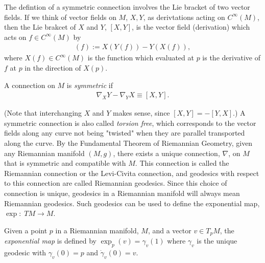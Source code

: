 The defintion of a symmetric connection involves the Lie bracket of two vector fields. If we think of vector fields on $M$, $X, Y$, as derivtations acting on $C^\infty (M)$, then the Lie brakcet of $X$ and $Y$, $[X , Y]$, is the vector field (derivation) which acts on $f \in C^\infty (M)$ by
\begin{align*}
[X , Y] (f) := X(Y(f)) - Y(X(f)),
\end{align*}
where $X(f) \in C^\infty (M)$ is the function which evaluated at $p$ is the derivative of $f$ at $p$ in the direction of $X(p)$. 

\begin{definition}
A connection on $M$ is \textit{symmetric} if 
\begin{align*}
\nabla_X Y - \nabla_Y X \equiv [X, Y].
\end{align*}
\end{definition}

(Note that interchanging $X$ and $Y$ makes sense, since $[X, Y] = - [Y, X]$.) A symmetric connection is also called \textit{torsion free}, which corresponds to the vector fields along any curve not being "twisted" when they are parallel transported along the curve. By the Fundamental Theorem of Riemannian Geometry, given any Riemannian manifold $(M,g)$, there exists a unique connection, $\nabla$, on $M$ that is symmetric and compatible with $M$. This connection is called the Riemannian connection or the Levi-Civita connection, and geodesics with respect to this connection are called Riemannian geodesics. Since this choice of connection is unique, geodesics in a Riemannian manifold will always mean Riemannian geodesics. Such geodesics can be used to define the exponential map, $\exp: \; TM \rightarrow M$.  

\begin{definition}
Given a point $p$ in a Riemannian manifold, $M$, and a vector $v \in T_p M$, the \textit{exponential map} is defined by $\exp_p (v) = \gamma_v(1)$ where $\gamma_v$ is the unique geodesic with $\gamma_v(0) = p$ and $\dot{\gamma}_v(0) = v$.
\end{definition}

